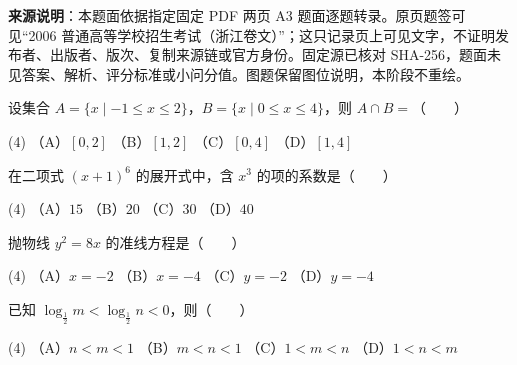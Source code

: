 


\begin{gktip}
\textbf{来源说明}：本题面依据指定固定 PDF 两页 A3 题面逐题转录。原页题签可见“2006 普通高等学校招生考试（浙江卷文）”；这只记录页上可见文字，不证明发布者、出版者、版次、复制来源链或官方身份。固定源已核对 SHA-256，题面未见答案、解析、评分标准或小问分值。图题保留图位说明，本阶段不重绘。
\end{gktip}


\begin{question}
设集合 $A=\{x\mid -1\leqslant x\leqslant 2\}$，$B=\{x\mid 0\leqslant x\leqslant 4\}$，则 $A\cap B=$\mbox{（　　）}

\begin{gkopts}(4)
\task （A）$[0,2]$
\task （B）$[1,2]$
\task （C）$[0,4]$
\task （D）$[1,4]$
\end{gkopts}

\end{question}
\begin{question}
在二项式 $(x+1)^6$ 的展开式中，含 $x^3$ 的项的系数是\mbox{（　　）}

\begin{gkopts}(4)
\task （A）$15$
\task （B）$20$
\task （C）$30$
\task （D）$40$
\end{gkopts}

\end{question}
\begin{question}
抛物线 $y^2=8x$ 的准线方程是\mbox{（　　）}

\begin{gkopts}(4)
\task （A）$x=-2$
\task （B）$x=-4$
\task （C）$y=-2$
\task （D）$y=-4$
\end{gkopts}

\end{question}
\begin{question}
已知 $\log_{\frac12}m<\log_{\frac12}n<0$，则\mbox{（　　）}

\begin{gkopts}(4)
\task （A）$n<m<1$
\task （B）$m<n<1$
\task （C）$1<m<n$
\task （D）$1<n<m$
\end{gkopts}

\end{question}
